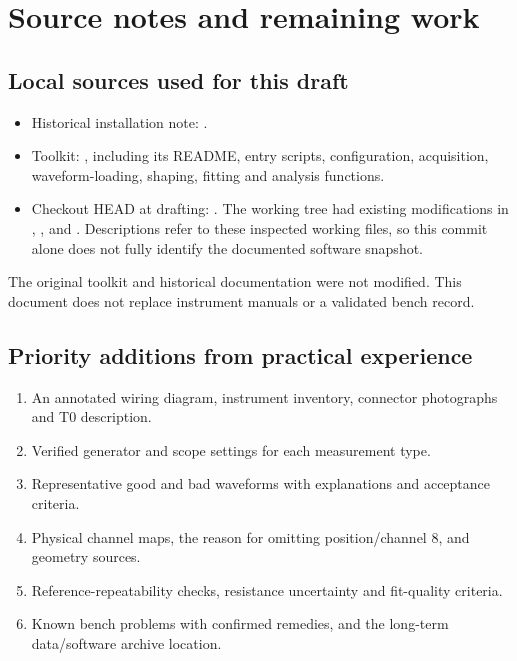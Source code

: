 \section{Source notes and remaining work}
\subsection{Local sources used for this draft}
\begin{itemize}
\item Historical installation note: .
\item Toolkit: , including its README, entry scripts, configuration, acquisition, waveform-loading, shaping, fitting and analysis functions.
\item Checkout HEAD at drafting: . The working tree had existing modifications in , ,  and . Descriptions refer to these inspected working files, so this commit alone does not fully identify the documented software snapshot.
\end{itemize}
The original toolkit and historical documentation were not modified. This document does not replace instrument manuals or a validated bench record.

\subsection{Priority additions from practical experience}
\begin{enumerate}
\item An annotated wiring diagram, instrument inventory, connector photographs and T0 description.
\item Verified generator and scope settings for each measurement type.
\item Representative good and bad waveforms with explanations and acceptance criteria.
\item Physical channel maps, the reason for omitting position/channel 8, and geometry sources.
\item Reference-repeatability checks, resistance uncertainty and fit-quality criteria.
\item Known bench problems with confirmed remedies, and the long-term data/software archive location.
\end{enumerate}
